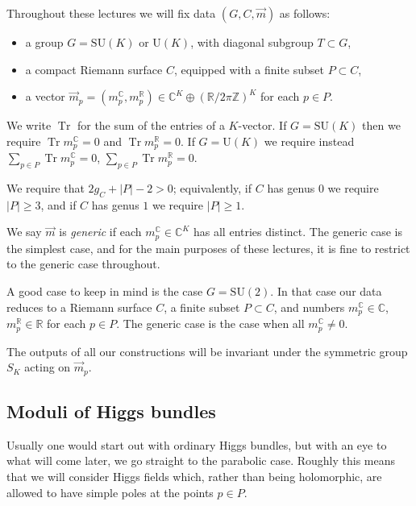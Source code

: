 \documentclass[12pt,letterpaper,reqno]{article}
\numberwithin{equation}{section}
\newcommand{\R}{\ensuremath{\mathbb R}}
\newcommand{\C}{\ensuremath{\mathbb C}}
\newcommand{\Z}{\ensuremath{\mathbb Z}}
\newcommand{\abs}[1]{\lvert#1\rvert}
\newcommand{\ti}[1]{\textit{#1}}
\DeclareMathOperator{\Tr}{Tr}
\newcommand{\SU}{\mathrm{SU}}
\newcommand{\U}{\mathrm{U}}
\newcommand{\insfig}[2]{

\medskip
\noindent
\begin{minipage}{\linewidth}

\makebox[\linewidth]{\texttt{[image: figures/\#1-crop.pdf]}}

\end{minipage}
\medskip

}
\newcommand{\fixme}[1]{{\color{orange}{[#1]}}}
\begin{document}
Throughout these lectures we will fix data $(G,C,\vec m)$ as follows:
\begin{itemize}
  \item a group $G = \SU(K)$ or $\U(K)$, with diagonal subgroup $T \subset G$,
  \item a compact Riemann surface $C$, equipped with a finite subset $P \subset C$,
  \item a vector $\vec{m}_p = (m^\C_p, m^\R_p) \in \C^K \oplus (\R / 2 \pi \Z)^K$ for each $p \in P$.
\end{itemize}
We write $\Tr$ for the sum of the entries of a $K$-vector.
If $G = \SU(K)$ then we require
$\Tr m_p^\C = 0$ and $\Tr m_p^\R = 0$.
If $G = \U(K)$ we require instead 
$\sum_{p \in P} \Tr m_p^\C = 0$,
$\sum_{p \in P} \Tr m_p^\R = 0$.

We require that $2g_C + \abs{P} - 2 > 0$; equivalently, 
if $C$ has genus $0$ we require $\abs{P} \ge 3$, 
and if $C$ has genus $1$ we require $\abs{P} \ge 1$.
\insfig{higgs-metric-1}{0.8}

\begin{defn}
We say $\vec{m}$ is \ti{generic} if each $m^\C_p \in \C^K$
has all entries distinct. 
The generic case is the simplest
case, and for the main purposes of these lectures,
it is fine to restrict to the generic case throughout.
\end{defn}

\begin{example}[The case of $G = \SU(2)$]
A good case to keep in mind is the case $G = \SU(2)$. In that case our data reduces to a Riemann surface $C$, a finite subset $P \subset C$,
and numbers $m^\C_p \in \C$, $m^\R_p \in \R$ for each $p \in P$. The generic case is the case when all $m^\C_p \neq 0$.
\end{example}

\begin{remark} The outputs of all our constructions will 
be invariant under the symmetric group $S_K$ acting on $\vec m_p$.
\end{remark}


\subsection{Moduli of Higgs bundles}

Usually one would start out with ordinary Higgs bundles,
but with an eye to what will come later, we go straight
to the parabolic case. Roughly this means that we will consider
Higgs fields which, rather than being holomorphic, are
allowed to have simple poles at the points $p \in P$.
\end{document}
